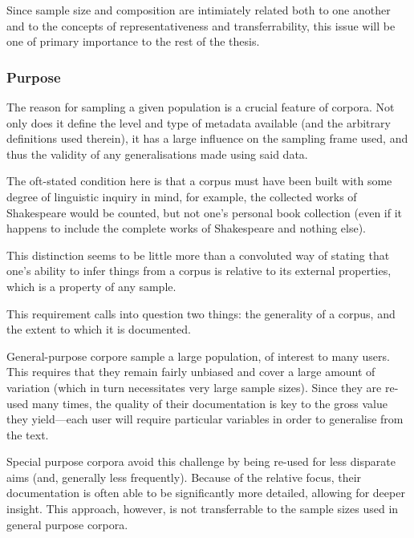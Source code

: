 Since sample size and composition are intimiately related both to one another and to the concepts of representativeness and transferrability, this issue will be one of primary importance to the rest of the thesis.






\subsubsection{Purpose}
The reason for sampling a given population is a crucial feature of corpora.  Not only does it define the level and type of metadata available (and the arbitrary definitions used therein), it has a large influence on the sampling frame used, and thus the validity of any generalisations made using said data.

The oft-stated condition here is that a corpus must have been built with some degree of linguistic inquiry in mind, for example, the collected works of Shakespeare would be counted, but not one's personal book collection (even if it happens to include the complete works of Shakespeare and nothing else). 

This distinction seems to be little more than a convoluted way of stating that one's ability to infer things from a corpus is relative to its external properties, which is a property of any sample.

This requirement calls into question two things: the generality of a corpus, and the extent to which it is documented.

General-purpose corpore sample a large population, of interest to many users.  This requires that they remain fairly unbiased and cover a large amount of variation (which in turn necessitates very large sample sizes).  Since they are re-used many times, the quality of their documentation is key to the gross value they yield---each user will require particular variables in order to generalise from the text.

Special purpose corpora avoid this challenge by being re-used for less disparate aims (and, generally less frequently).  Because of the relative focus, their documentation is often able to be significantly more detailed, allowing for deeper insight.  This approach, however, is not transferrable to the sample sizes used in general purpose corpora.


